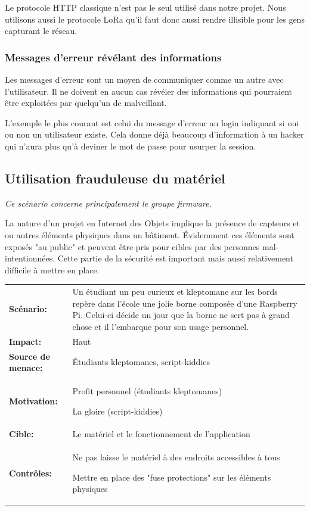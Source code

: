 \documentclass[12pt]{article}
\begin{document}
Le protocole HTTP classique n'est pas le seul utilisé dans notre projet. Nous utilisons aussi le protocole LoRa qu'il faut donc aussi rendre illisible pour les gens capturant le réseau.

\subsubsection{Messages d'erreur révélant des informations}

Les messages d'erreur sont un moyen de communiquer comme un autre avec l'utilisateur. Il ne doivent en aucun cas révéler des informations qui pourraient être exploitées par quelqu'un de malveillant. 

L'exemple le plus courant est celui du message d'erreur au login indiquant si oui ou non un utilisateur existe. Cela donne déjà beaucoup d'information à un hacker qui n'aura plus qu'à deviner le mot de passe pour usurper la session. 
\clearpage

\subsection{Utilisation frauduleuse du matériel}

\emph{Ce scénario concerne principalement le groupe firmware.}
\medskip

La nature d'un projet en Internet des Objets implique la présence de capteurs et ou autres éléments physiques dans un bâtiment. Évidemment ces éléments sont exposés "au public" et peuvent être pris pour cibles par des personnes mal-intentionnées. Cette partie de la sécurité est important mais aussi relativement difficile à mettre en place.  
\medskip

\renewcommand{\arraystretch}{1.6}
\begin{tabular}{@{}p{4cm}p{12cm}}
\textbf{Scénario:} &  Un étudiant un peu curieux et kleptomane sur les bords repère dans l'école une jolie borne composée d'une Raspberry Pi. Celui-ci décide un jour que la borne ne sert pas à grand chose et il l'embarque pour son usage personnel.\\
\textbf{Impact:} & Haut \\
\textbf{Source de menace: } & Étudiants kleptomanes, script-kiddies \\
\textbf{Motivation:} & Profit personnel (étudiants kleptomanes)

La gloire (script-kiddies)\\
\textbf{Cible:} & Le matériel et le fonctionnement de l'application \\
\textbf{Contrôles:} & Ne pas laisse le matériel à des endroits accessibles à tous

Mettre en place des "fuse protections" sur les éléments physiques
\end{tabular}
\renewcommand{\arraystretch}{1}
\end{document}
